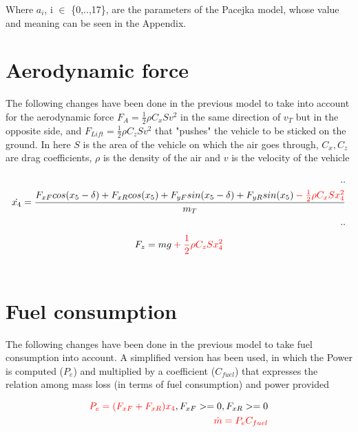 \documentclass{report}
\let\Oldsection\section
\renewcommand{\section}{\FloatBarrier\Oldsection}
\begin{document}
Where $a_i$, i $\in$ \{0,..,17\}, are the parameters of the Pacejka model, whose value and meaning can be seen in the Appendix.

\section{Aerodynamic force}

The \color{red} following \color{black} changes have been done in the previous model to take into account for the aerodynamic force $F_A = \frac{1}{2} \rho C_x S v^2$ in the same direction of $v_T$ but in the opposite side, and $F_{Lift} = \frac{1}{2} \rho C_z S v^2$ that "pushes" the vehicle to be sticked on the ground. In here $S$ is the area of the vehicle on which the air goes through, $C_x, C_z$ are drag coefficients, $\rho$ is the density of the air and $v$ is the velocity of the vehicle

\begin{equation}
\begin{aligned}
..\\
\dot{x_4} = \frac{F_{xF} cos(x_5-\delta) + F_{xR} cos(x_5) + F_{yF} sin(x_5-\delta) + F_{yR} sin(x_5) \color{red} -\frac{1}{2} \rho C_x S x_{4}^2 \color{black}}{m_T} \\
..\\
\end{aligned}
\end{equation}
\begin{equation}
\begin{aligned}
F_z = mg \color{red} + \frac{1}{2} \rho C_z S x_{4}^2 \color{black} \\\\
\end{aligned}
\end{equation}

\section{Fuel consumption}

The \color{red} following \color{black} changes have been done in the previous model to take fuel consumption into account. A simplified version has been used, in which the Power is computed ($P_e$) and multiplied by a coefficient ($C_{fuel}$) that expresses the relation among mass loss (in terms of fuel consumption) and power provided

\begin{equation}
\begin{aligned}
\color{red} P_e = (F_{xF} + F_{xR}) x_4 \color{black}, F_{xF}>=0, F_{xR}>=0 \\
\color{red} \dot{m} = P_e C_{fuel} \color{black}\\
\end{aligned}
\end{equation}
\end{document}
